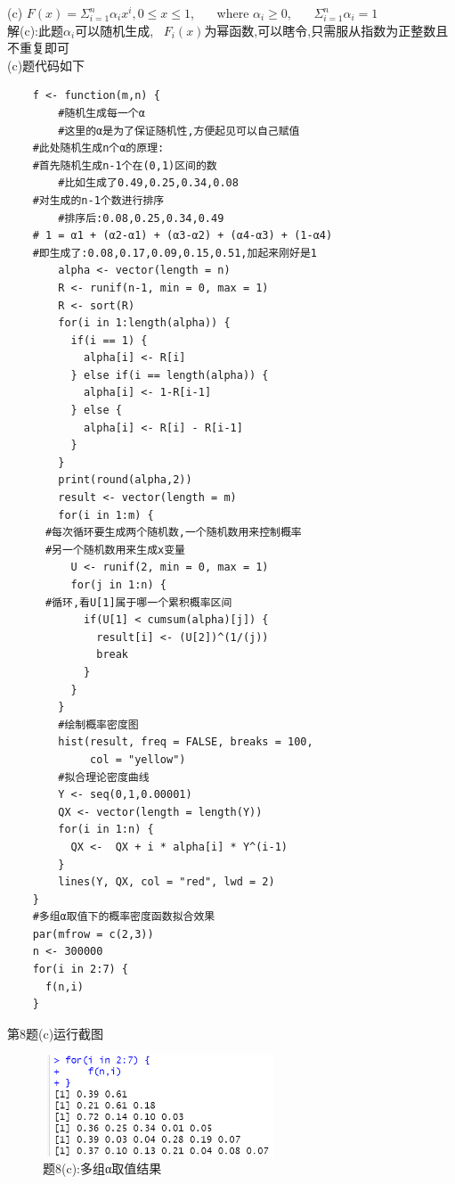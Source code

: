 \documentclass{book}
\begin{document}
(c) $F(x) = \Sigma_{i=1}^{n} \alpha_{i}x^{i}, 0 \leq x \leq 1$, \ \ \
where $\alpha_{i} \geq 0$,  \ \ \ $\Sigma_{i=1}^{n} \alpha_{i} = 1$  \\
解(c):此题$\alpha_{i}$可以随机生成, \ $F_{i}(x)$为幂函数,可以瞎令,只需服从指数为正整数且不重复即可  \\
(c)题代码如下
\lstset{language = R}
\begin{lstlisting}
    f <- function(m,n) {
        #随机生成每一个α
        #这里的α是为了保证随机性,方便起见可以自己赋值
    #此处随机生成n个α的原理:
    #首先随机生成n-1个在(0,1)区间的数
        #比如生成了0.49,0.25,0.34,0.08
    #对生成的n-1个数进行排序
        #排序后:0.08,0.25,0.34,0.49
    # 1 = α1 + (α2-α1) + (α3-α2) + (α4-α3) + (1-α4)
    #即生成了:0.08,0.17,0.09,0.15,0.51,加起来刚好是1
        alpha <- vector(length = n)
        R <- runif(n-1, min = 0, max = 1)
        R <- sort(R)
        for(i in 1:length(alpha)) {
          if(i == 1) {
            alpha[i] <- R[i]
          } else if(i == length(alpha)) {
            alpha[i] <- 1-R[i-1]
          } else {
            alpha[i] <- R[i] - R[i-1]
          }
        }
        print(round(alpha,2))
        result <- vector(length = m)
        for(i in 1:m) {
      #每次循环要生成两个随机数,一个随机数用来控制概率
      #另一个随机数用来生成x变量
          U <- runif(2, min = 0, max = 1)
          for(j in 1:n) {
      #循环,看U[1]属于哪一个累积概率区间
            if(U[1] < cumsum(alpha)[j]) {
              result[i] <- (U[2])^(1/(j))
              break
            } 
          }
        }
        #绘制概率密度图
        hist(result, freq = FALSE, breaks = 100, 
             col = "yellow")
        #拟合理论密度曲线
        Y <- seq(0,1,0.00001)
        QX <- vector(length = length(Y))
        for(i in 1:n) {
          QX <-  QX + i * alpha[i] * Y^(i-1)
        }
        lines(Y, QX, col = "red", lwd = 2)
    }
    #多组α取值下的概率密度函数拟合效果
    par(mfrow = c(2,3))
    n <- 300000
    for(i in 2:7) {
      f(n,i)
    }
\end{lstlisting}
第8题(c)运行截图
\begin{figure}[H]
  \centering
  \includegraphics*[height = 3cm, width = 7cm]{gramFile/第八题/(c)题多组α取值结果.PNG}
  \caption{题8(c):多组α取值结果}
\end{figure}
\end{document}
